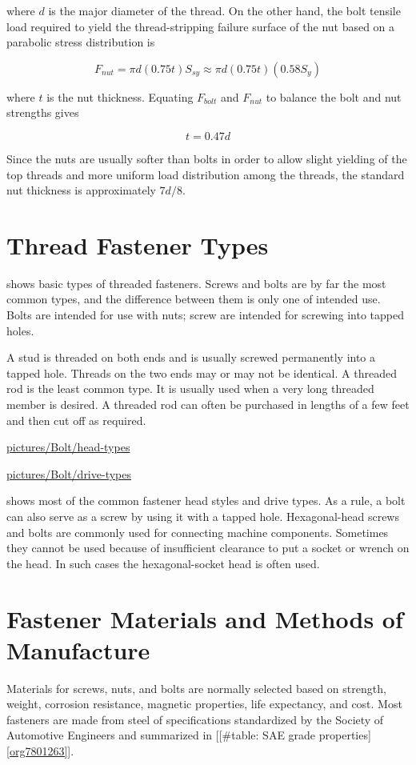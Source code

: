 \documentclass[a4paper,openany,12pt]{book}
\begin{document}
{{where \(d\) is the major diameter of the thread. On the other hand, the
bolt tensile load required to yield the thread-stripping failure surface
of the nut based on a parabolic stress distribution is

$$F_{nut} = \pi d(0.75t)S_{sy} \approx \pi d(0.75t)(0.58S_y)$$

where \(t\) is the nut thickness. Equating \(F_{bolt}\) and \(F_{nut}\) to
balance the bolt and nut strengths gives


$$\label{eqn: required nut thickness}
  t = 0.47d$$

Since the nuts are usually softer than bolts in order to allow slight
yielding of the top threads and more uniform load distribution among the
threads, the standard nut thickness is approximately \(7d/8\).

\section{Thread Fastener Types}
\label{sec:orge3cdd87}
shows basic types of threaded fasteners. Screws and bolts are by far the
most common types, and the difference between them is only one of
intended use. Bolts are intended for use with nuts; screw are intended
for screwing into tapped holes.


A stud is threaded on both ends and is usually screwed permanently into
a tapped hole. Threads on the two ends may or may not be identical. A
threaded rod is the least common type. It is usually used when a very
long threaded member is desired. A threaded rod can often be purchased
in lengths of a few feet and then cut off as required.


\url{pictures/Bolt/head-types}


\url{pictures/Bolt/drive-types}

shows most of the common fastener head styles and drive types. As a
rule, a bolt can also serve as a screw by using it with a tapped hole.
Hexagonal-head screws and bolts are commonly used for connecting machine
components. Sometimes they cannot be used because of insufficient
clearance to put a socket or wrench on the head. In such cases the
hexagonal-socket head is often used.

\section{Fastener Materials and Methods of Manufacture}
\label{sec:org391a4ec}
Materials for screws, nuts, and bolts are normally selected based on
strength, weight, corrosion resistance, magnetic properties, life
expectancy, and cost. Most fasteners are made from steel of
specifications standardized by the Society of Automotive Engineers and
summarized in
[[\#table: SAE grade properties]\ref{org7801263}].

}}
\end{document}
